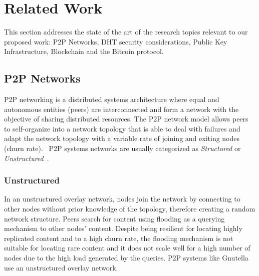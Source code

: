 \chapter{Related Work}
\label{chapter:relatedwork}
This section addresses the state of the art of the research topics relevant to our proposed work: P2P Networks, DHT security considerations, Public Key Infrastructure, Blockchain and the Bitcoin protocol.

\section{P2P Networks}

\ac{P2P} networking is a distributed systems architecture where equal and autonomous entities (peers) are interconnected and form a network with the objective of sharing distributed resources.
The \ac{P2P} network model allows peers to self-organize into a network topology that is able to deal with failures and adapt the network topology with a variable rate of joining and exiting nodes (churn rate).~\cite{GuptaA11}
\ac{P2P} systems networks are usually categorized as \textit{Structured} or \textit{Unstructured}~\cite{Lua2005}.

\subsection{Unstructured} In an unstructured overlay network, nodes join the network by connecting to other nodes without prior knowledge of the topology, therefore creating a random network structure.
Peers search for content using flooding as a querying mechanism to other nodes' content.
Despite being resilient for locating highly replicated content and to a high churn rate, the flooding mechanism is not suitable for locating rare content and it does not scale well for a high number of nodes due to the high load generated by the queries.
\ac{P2P} systems like Gnutella~\cite{gnutella} use an unstructured overlay network.

